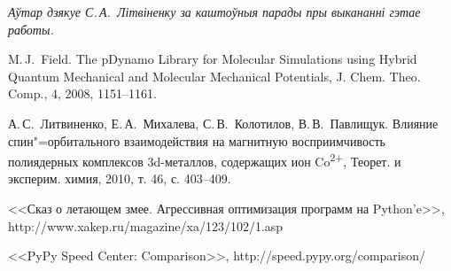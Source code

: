 \documentclass[a4paper,12pt]{article}
\newcommand{\aknowl}{\textit} %
\begin{document}
\aknowl{Аўтар дзякуе С.\,А.~Літвіненку за каштоўныя парады пры выкананні гэтае работы.}


\newpage\begin{thebibliography}{9}

 M.\,J.~Field. The pDynamo Library for Molecular Simulations using Hybrid Quantum Mechanical and Molecular Mechanical Potentials, J. Chem. Theo. Comp.,  4, 2008, 1151--1161.

 А.\,С.~Литвиненко, Е.\,А.~Михалева, С.\,В.~Колотилов, В.\,В.~Павлищук. Влияние спин"=орбитального взаимодействия на магнитную восприимчивость полиядерных комплексов 3d-металлов, содержащих ион Co\textsuperscript{2+}, Теорет. и эксперим. химия, 2010, т. 46, с. 403--409.

 <<Сказ о летающем змее. Агрессивная оптимизация программ на Python'e>>,  http://www.xakep.ru/magazine/xa/123/102/1.asp

 <<PyPy Speed Center: Comparison>>, http://speed.pypy.org/comparison/
\end{thebibliography}
\end{document}
